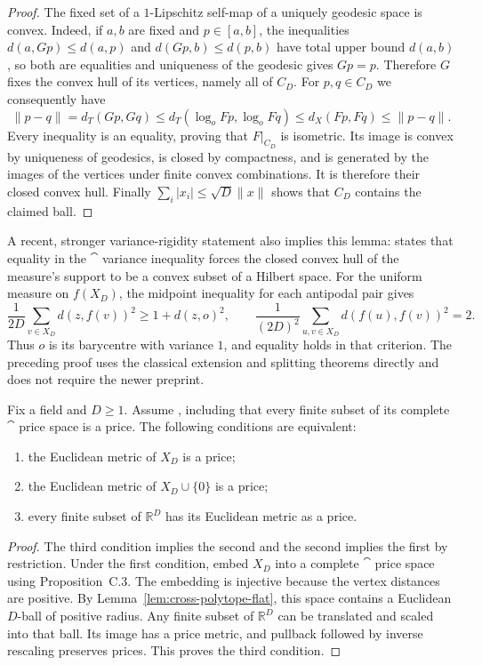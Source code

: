 \begin{proof}
The fixed set of a $1$-Lipschitz self-map of a uniquely geodesic space
is convex. Indeed, if $a,b$ are fixed and $p\in[a,b]$, the inequalities
$d(a,Gp)\le d(a,p)$ and $d(Gp,b)\le d(p,b)$ have total upper bound
$d(a,b)$, so both are equalities and uniqueness of the geodesic gives
$Gp=p$. Therefore $G$ fixes the convex hull of its vertices, namely
all of $C_D$. For $p,q\in C_D$ we consequently have
\[
 \|p-q\|=d_T(Gp,Gq)
 \le d_T(\log_o Fp,\log_o Fq)
 \le d_X(Fp,Fq)\le\|p-q\|.
\]
Every inequality is an equality, proving that $F|_{C_D}$ is isometric.
Its image is convex by uniqueness of geodesics, is closed by
compactness, and is generated by the images of the vertices under
finite convex combinations. It is therefore their closed convex
hull. Finally $\sum_i|x_i|\le\sqrt D\|x\|$ shows that $C_D$ contains
the claimed ball.
\end{proof}

A recent, stronger variance-rigidity statement also implies this
lemma: \cite[Proposition~1.4 and Section~13.1]{Lytchak2026geometry}
states that equality in the $\cat$ variance inequality forces the
closed convex hull of the measure's support to be a convex subset of
a Hilbert space. For the uniform measure on $f(X_D)$, the midpoint
inequality for each antipodal pair gives
\[
 \frac1{2D}\sum_{v\in X_D}d(z,f(v))^2\ge1+d(z,o)^2,
 \qquad
 \frac1{(2D)^2}\sum_{u,v\in X_D}d(f(u),f(v))^2=2.
\]
Thus $o$ is its barycentre with variance $1$, and equality holds in
that criterion. The preceding proof uses the classical extension and
splitting theorems directly and does not require the newer preprint.

\begin{theorem}
\label{thm:cross-polytope-price-flat}
Fix a field and $D\ge1$. Assume
\cite[Proposition~C.3, p.~28]{Anthropic2026}, including that every
finite subset of its complete $\cat$ price space is a price. The
following conditions are equivalent:
\begin{enumerate}
\item the Euclidean metric of $X_D$ is a price;
\item the Euclidean metric of $X_D\cup\{0\}$ is a price;
\item every finite subset of $\mathbb R^D$ has its Euclidean metric
as a price.
\end{enumerate}
\end{theorem}

\begin{proof}
The third condition implies the second and the second implies the
first by restriction. Under the first condition, embed $X_D$ into a
complete $\cat$ price space using Proposition~C.3. The embedding is
injective because the vertex distances are positive. By
Lemma~\ref{lem:cross-polytope-flat}, this space contains a Euclidean
$D$-ball of positive radius. Any finite subset of $\mathbb R^D$ can
be translated and scaled into that ball. Its image has a price
metric, and pullback followed by inverse rescaling preserves prices.
This proves the third condition.
\end{proof}

